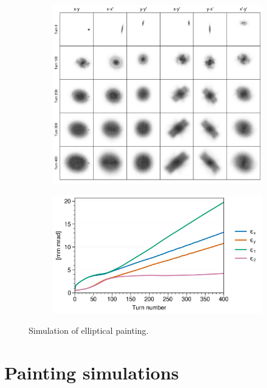 \begin{figure}[!p]
    \centering
    \begin{subfigure}{\textwidth}
        \includegraphics[width=\textwidth]{Images/chapter3/snapshots.png}
    \end{subfigure}
    \vfill
    \vspace*{1.0cm}
    \vfill
    \begin{subfigure}{0.7\textwidth}
        \includegraphics[width=\textwidth]{Images/chapter3/emittances.png}
    \end{subfigure}
    \caption{Simulation of elliptical painting.}
    \label{fig:my_label}
\end{figure}




\section{Painting simulations}
